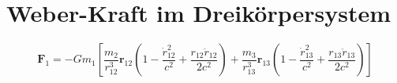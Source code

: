 \section{Weber-Kraft im Dreikörpersystem}
\[ \mathbf{F}_1 = -Gm_1 \left[
    \frac{m_2}{r_{12}^3} \mathbf{r}_{12} \left(1 - \frac{\dot{r}_{12}^2}{c^2} + \frac{r_{12}\ddot{r}_{12}}{2c^2}\right) +
    \frac{m_3}{r_{13}^3} \mathbf{r}_{13} \left(1 - \frac{\dot{r}_{13}^2}{c^2} + \frac{r_{13}\ddot{r}_{13}}{2c^2}\right)
\right] \]